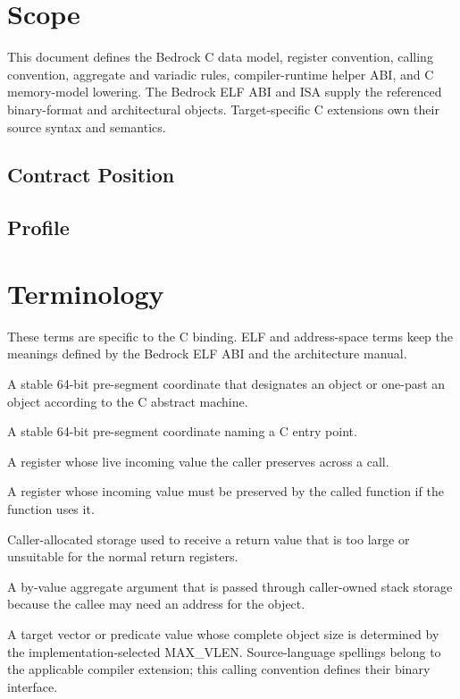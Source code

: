 \documentclass[10pt,twoside]{article}
\begin{document}
\BedrockFrontMatter

\clearpage
\section{Scope}\label{page:scope}
This document defines the Bedrock C data model, register convention, calling
convention, aggregate and variadic rules, compiler-runtime helper ABI, and C
memory-model lowering. The Bedrock ELF ABI and ISA supply the referenced
binary-format and architectural objects. Target-specific C extensions own
their source syntax and semantics.

\subsection{Contract Position}

\subsection{Profile}

\clearpage
\section{Terminology}\label{page:terminology}
These terms are specific to the C binding. ELF and address-space terms keep the meanings defined by the Bedrock ELF ABI and the architecture manual.
\begin{description}[style=nextline,leftmargin=1.45in,labelwidth=1.35in,itemsep=3pt,topsep=3pt]
\item[object pointer] A stable 64-bit pre-segment coordinate that designates an object or one-past an object according to the C abstract machine.
\item[function pointer] A stable 64-bit pre-segment coordinate naming a C entry point.
\item[caller-saved register] A register whose live incoming value the caller preserves across a call.
\item[callee-saved register] A register whose incoming value must be preserved by the called function if the function uses it.
\item[sret buffer] Caller-allocated storage used to receive a return value that is too large or unsuitable for the normal return registers.
\item[addressable by-value argument] A by-value aggregate argument that is passed through caller-owned stack storage because the callee may need an address for the object.
\item[scalable value] A target vector or predicate value whose complete object
size is determined by the implementation-selected MAX\_VLEN. Source-language
spellings belong to the applicable compiler extension; this calling convention
defines their binary interface.
\end{description}
\end{document}
